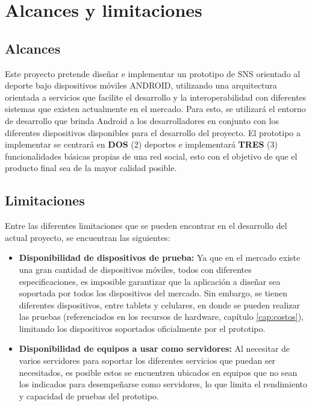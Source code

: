 \section{Alcances y limitaciones}

\subsection{Alcances}

Este proyecto pretende diseñar e implementar un prototipo de SNS orientado al deporte bajo dispositivos móviles ANDROID, utilizando una arquitectura orientada a servicios que facilite el desarrollo y la interoperabilidad con diferentes sistemas que existen actualmente en el mercado. Para esto, se utilizará el entorno de desarrollo que brinda Android a los desarrolladores en conjunto con los diferentes dispositivos disponibles para el desarrollo del proyecto. El prototipo a implementar se centrará en \textbf{DOS} (2) deportes e implementará \textbf{TRES} (3) funcionalidades básicas propias de una red social, esto con el objetivo de que el producto final sea de la mayor calidad posible.

\subsection{Limitaciones}

Entre las diferentes limitaciones que se pueden encontrar en el desarrollo del actual proyecto, se encuentran las siguientes:

\begin{itemize}
  \item \textbf{Disponibilidad de dispositivos de prueba:} Ya que en el mercado existe una gran cantidad de dispositivos móviles, todos con diferentes especificaciones, es imposible garantizar que la aplicación a diseñar sea soportada por todos los dispositivos del mercado. Sin embargo, se tienen diferentes dispositivos, entre tablets y celulares, en donde se pueden realizar las pruebas (referenciados en los recursos de hardware, capítulo \ref{cap:costos}), limitando los dispositivos soportados oficialmente por el prototipo.

  \item \textbf{Disponibilidad de equipos a usar como servidores:} Al necesitar de varios servidores para soportar los diferentes servicios que puedan ser necesitados, es posible estos se encuentren ubicados en equipos que no sean los indicados para desempeñarse como servidores, lo que limita el rendimiento y capacidad de pruebas del prototipo.
\end{itemize}
